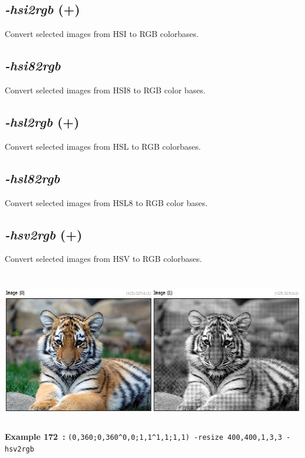 \documentclass[a4paper,11pt,twoside]{book}
\begin{document}
\subsection{\emph{-hsi2rgb} (+)}\vspace*{-0.5em}
Convert selected images from HSI to RGB colorbases.


\subsection{\emph{-hsi82rgb} }\vspace*{-0.5em}
Convert selected images from HSI8 to RGB color bases.


\subsection{\emph{-hsl2rgb} (+)}\vspace*{-0.5em}
Convert selected images from HSL to RGB colorbases.


\subsection{\emph{-hsl82rgb} }\vspace*{-0.5em}
Convert selected images from HSL8 to RGB color bases.


\subsection{\emph{-hsv2rgb} (+)}\vspace*{-0.5em}
Convert selected images from HSV to RGB colorbases.
\begin{center}\includegraphics[keepaspectratio=true,height=7cm,width=\textwidth]{img/gmic_def172.jpg}\\
{\footnotesize \textbf{Example 172~:} \texttt{(0,360;0,360\textasciicircum 0,0;1,1\textasciicircum 1,1;1,1) -resize 400,400,1,3,3 -hsv2rgb}}
\end{center}
\end{document}

